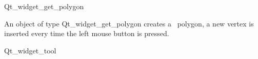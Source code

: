 
\begin{ccRefClass}{Qt_widget_get_polygon}

\ccDefinition
An object of type Qt\_widget\_get\_polygon creates a \cgal\ polygon, a new 
vertex is inserted every time the left mouse button is pressed.

\ccInheritsFrom
Qt\_widget\_tool

\ccGlue

\ccCreation
{}


\end{ccRefClass}









